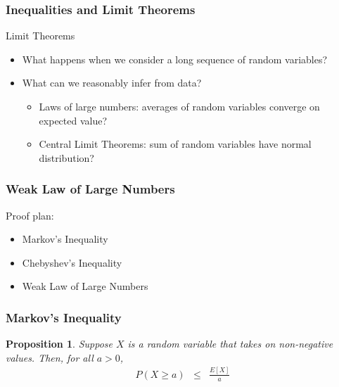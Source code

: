 \documentclass{beamer}
\newtheorem{prop}{Proposition}
\numberwithin{equation}{section}
\begin{document}
\begin{frame}
\frametitle{Inequalities and Limit Theorems}

\alert{Limit Theorems}
\begin{itemize}
\item[-] What happens when we consider a long sequence of random variables?
\item[-] What can we reasonably infer from data?
\begin{itemize}
\item[-] Laws of large numbers: averages of random variables converge on expected value?
\item[-] Central Limit Theorems: sum of random variables have normal distribution?
\end{itemize}
\end{itemize}


\end{frame}


\begin{frame}
\frametitle{Weak Law of Large Numbers}

Proof plan: 
\begin{itemize}
\item[-] Markov's Inequality
\item[-] Chebyshev's Inequality
\item[-] Weak Law of Large Numbers 
\end{itemize}


\end{frame}



\begin{frame}
\frametitle{Markov's Inequality}

\begin{prop}
Suppose $X$ is a random variable that takes on non-negative values.  Then, for all $a>0$, 
\begin{eqnarray}
P(X\geq a) & \leq & \frac{E[X]}{a} \nonumber 
\end{eqnarray}
\end{prop}

\end{frame}
\end{document}
